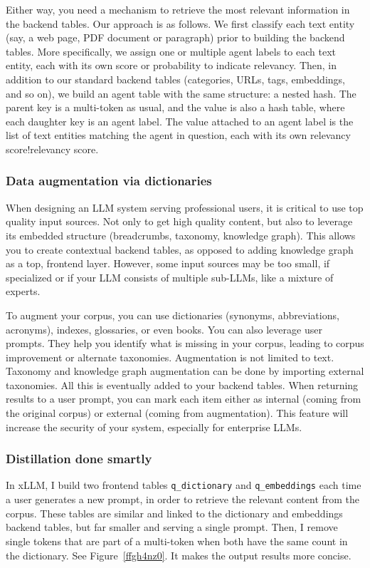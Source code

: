 \documentclass[10pt]{article}
\begin{document}
{Either way, you need a mechanism to retrieve the most relevant information in the backend tables. Our approach is as follows. We first classify each \textcolor{index}{text entity} (say, a web page, PDF document or paragraph) prior to building the backend tables. More specifically, we assign one or multiple agent labels to each text entity, each with its own score or probability to indicate relevancy. Then, in addition to our standard backend tables (categories, URLs, tags, embeddings, and so on), we build an agent table with the same structure: a \textcolor{index}{nested hash}. The parent key is a multi-token as usual, and the value is also a hash table, where each daughter key is an agent label. The value attached to an agent label is the list of text entities matching the agent in question, each with its own \textcolor{index}{relevancy score!relevancy score}.

\subsubsection{Data augmentation via dictionaries}
When designing an LLM system serving professional users, it is critical to use top quality input sources. Not only to get high quality content, but also to leverage its embedded structure (breadcrumbs, taxonomy, knowledge graph). This allows you to create contextual backend tables, as opposed to adding knowledge graph as a top, frontend layer. However, some input sources may be too small, if specialized or if your LLM consists of multiple sub-LLMs, like a \textcolor{index}{mixture of experts}.

To augment your corpus, you can use dictionaries (synonyms, abbreviations, \textcolor{index}{acronyms}), indexes, glossaries, or even books. You can also leverage user prompts. They help you identify what is missing in your corpus, leading to corpus improvement or alternate taxonomies. Augmentation is not limited to text. Taxonomy and knowledge graph augmentation can be done by importing external taxonomies. All this is eventually added to your backend tables. When returning results to a user prompt, you can mark each item either as internal (coming from the original corpus) or external (coming from augmentation). This feature will increase the security of your system, especially for enterprise LLMs.



\subsubsection{Distillation done smartly}
In xLLM, I build two frontend tables \texttt{q\_dictionary} and \texttt{q\_embeddings} each time a user generates a new prompt, in order to retrieve the relevant content from the corpus. These tables are similar and linked to the dictionary and embeddings backend tables, but far smaller and serving a single prompt. Then, I remove single tokens that are part of a multi-token when both have the same count in the dictionary. See Figure~\ref{ffgh4nz0}. It makes the output results more concise.


}
\end{document}
